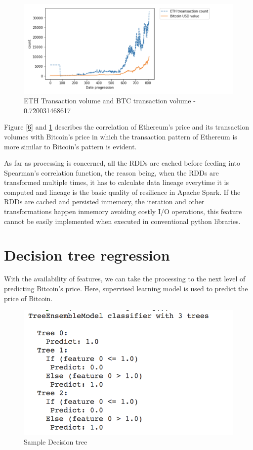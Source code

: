 \documentclass[sigconf]{acmart}
\begin{document}
\begin{figure}[!ht]
  \centering\includegraphics[width=\columnwidth]{images/ethtrancount.png}
  \caption{ETH Transaction volume and BTC transaction volume - 0.720031468617 }
  \label{7}
\end{figure}

Figure \ref{6} and \ref{7} describes the correlation of Ethereum's price and its transaction volumes with Bitcoin's price in which the transaction pattern of Ethereum is more similar to Bitcoin's pattern is evident. 

As far as processing is concerned, all the RDDs are cached before feeding into Spearman's correlation function, the reason being, when the RDDs are transformed multiple times, it has to calculate data lineage everytime it is computed and lineage is the basic quality of resilience in Apache Spark. If the RDDs are cached and persisted inmemory, the iteration and other transformations happen inmemory avoiding costly I/O operations, this feature cannot be easily implemented when executed in conventional python libraries.


\section{Decision tree regression}
With the availability of features, we can take the processing to the next level of predicting Bitcoin's price. Here, supervised learning model is used to predict the price of Bitcoin.

\begin{figure}[!ht]
  \centering\includegraphics[width=\columnwidth]{images/Decisiontree.png}
  \caption{Sample Decision tree}
  \label{fig:8decisiongree}
\end{figure}
 
\end{document}
